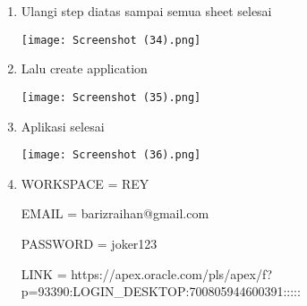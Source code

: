\documentclass{article}
\begin{document}
\begin{enumerate}
\begin{center}
        \end{center}
        \item Ulangi step diatas sampai semua sheet selesai
        \begin{center}
            \texttt{[image: Screenshot (34).png]}
        \end{center}
        \item Lalu create application
        \begin{center}
            \texttt{[image: Screenshot (35).png]}
        \end{center}
        \item Aplikasi selesai
        \begin{center}
            \texttt{[image: Screenshot (36).png]}
        \end{center}
        \item WORKSPACE = REY
        
        EMAIL = barizraihan@gmail.com
        
        PASSWORD = joker123
        
        LINK = https://apex.oracle.com/pls/apex/f?p=93390:LOGIN_DESKTOP:700805944600391:::::
\end{enumerate}
\end{document}
